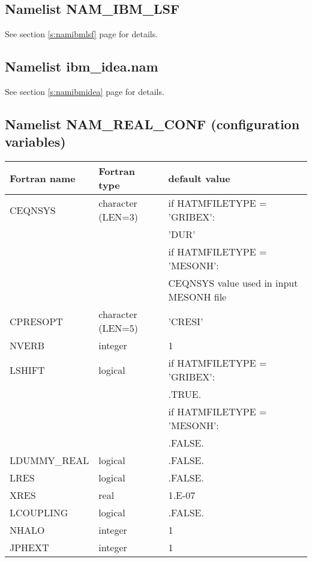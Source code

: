 \subsection{Namelist NAM\_IBM\_LSF}
See section \ref{s:namibmlsf} page \pageref{s:namibmlsf} for details.

\subsection{Namelist ibm\_idea.nam}
See section \ref{s:namibmidea} page \pageref{s:namibmidea} for details.

\subsection{Namelist NAM\_REAL\_CONF  (configuration variables)}

\begin{center}
\begin{tabular} {|l|l|l|}
\hline
Fortran name & Fortran type & default value\\
\hline
\hline
CEQNSYS       & character (LEN=3)  &if HATMFILETYPE = 'GRIBEX': \\
 & & \hspace*{0.5cm}'DUR' \\
              &                    & if HATMFILETYPE = 'MESONH': \\
 & & \hspace*{0.5cm} CEQNSYS value used in input MESONH file\\
CPRESOPT      & character (LEN=5)  & 'CRESI' \\
NVERB         & integer            & 1      \\
LSHIFT        & logical            & if HATMFILETYPE = 'GRIBEX':  \\
 & & \hspace*{0.5cm}.TRUE. \\
              &                    & if HATMFILETYPE = 'MESONH': \\
 & & \hspace*{0.5cm}.FALSE. \\
LDUMMY\_REAL  & logical            & .FALSE.                     \\
LRES          & logical            & .FALSE.                     \\
XRES          & real               & 1.E-07                      \\
LCOUPLING     & logical            & .FALSE.                     \\
NHALO      & integer        & 1      \\
JPHEXT     & integer        & 1      \\
\hline
\end{tabular}
\end{center}

